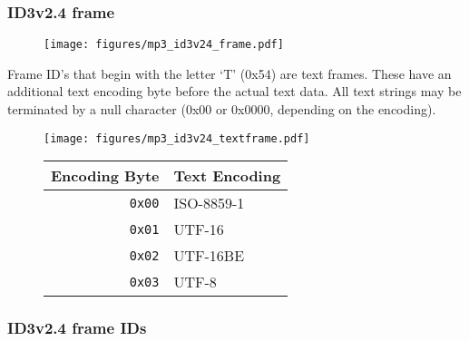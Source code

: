 \subsubsection{ID3v2.4 frame}
\begin{figure}[h]
\texttt{[image: figures/mp3\_id3v24\_frame.pdf]}
\end{figure}
\par
\noindent
Frame ID's that begin with the letter `T' (0x54) are text frames.
These have an additional text encoding byte before the actual
text data.
All text strings may be terminated by a null character
(0x00 or 0x0000, depending on the encoding).
\begin{figure}[h]
\texttt{[image: figures/mp3\_id3v24\_textframe.pdf]}
\begin{tabular}{r|l}
Encoding Byte & Text Encoding \\
\hline
\texttt{0x00} & ISO-8859-1 \\
\texttt{0x01} & UTF-16 \\
\texttt{0x02} & UTF-16BE \\
\texttt{0x03} & UTF-8
\end{tabular}
\end{figure}

\pagebreak

\subsubsection{ID3v2.4 frame IDs}


